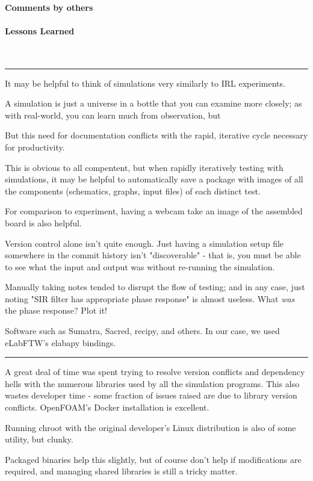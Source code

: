 \documentclass[fleqn,10pt]{article}
\begin{document}
\begin{multicols}{1}
\paragraph{Comments by others}

\paragraph{Lessons Learned} \


\rule{\linewidth}{0.2pt}

It may be helpful to think of simulations very similarly to IRL experiments. 

A simulation is just a universe in a bottle that you can examine more closely; as with real-world, you can learn much from observation, but 

But this need for documentation conflicts with the rapid, iterative cycle necessary for productivity.

This is obvious to all compentent, but when rapidly iteratively testing with simulations, it may be helpful to automatically save a package with images of all the components (schematics, graphs, input files) of each distinct test. 

For comparison to experiment, having a webcam take an image of the assembled board is also helpful. 

Version control alone isn't quite enough. Just having a simulation setup file somewhere in the commit history isn't "discoverable" - that is, you must be able to see what the input and output was without re-running the simulation. 

Manually taking notes tended to disrupt the flow of testing; and in any case, just noting "SIR filter has appropriate phase response" is almost useless. What {\it was} the phase response? Plot it!

Software such as Sumatra, Sacred, recipy, and others. In our case, we used eLabFTW's elabapy bindings.

\rule{\linewidth}{0.2pt}

A great deal of time was spent trying to resolve version conflicts and dependency hells with the numerous libraries used by all the simulation programs. This also wastes developer time - some fraction of issues raised are due to library version conflicts. OpenFOAM's Docker installation is excellent.

Running chroot with the original developer's Linux distribution is also of some utility, but clunky. 

Packaged binaries help this slightly, but of course don't help if modifications are required, and managing shared libraries is still a tricky matter.


\end{multicols}
\end{document}
